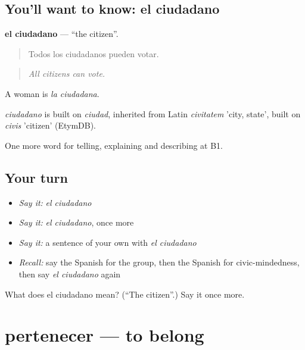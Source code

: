 \subsection*{You'll want to know: el ciudadano}
\textbf{el ciudadano} — \textquotedblleft{}the citizen\textquotedblright{}.

\begin{quote}
Todos los ciudadanos pueden votar.
\end{quote}

\begin{quote}
\emph{All citizens can vote.}
\end{quote}

A woman is \emph{la ciudadana}.

\begin{cousinweb}
\emph{ciudadano} is built on \emph{ciudad}, inherited from Latin \emph{civitatem} 'city, state', built on \emph{civis} 'citizen' (EtymDB).
\end{cousinweb}

\begin{grammarlens}[title={What you've built}]
One more word for telling, explaining and describing at B1.
\end{grammarlens}

\subsection*{Your turn}
\begin{itemize}
\raggedright
  \item \emph{Say it:} \emph{el ciudadano}
  \item \emph{Say it:} \emph{el ciudadano}, once more
  \item \emph{Say it:} a sentence of your own with \emph{el ciudadano}
  \item \emph{Recall:} say the Spanish for the group, then the Spanish for civic-mindedness, then say \emph{el ciudadano} again
\end{itemize}

\begin{tcolorbox}[breakable,colback=teal!4,colframe=teal!35!black,title={Before you move on}]
What does el ciudadano mean? (\textquotedblleft{}The citizen\textquotedblright{}.) Say it once more.
\end{tcolorbox}
\section[pertenecer]{pertenecer — to belong}

